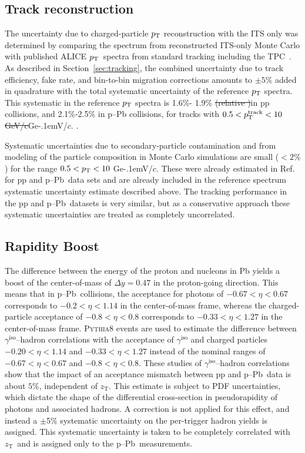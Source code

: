 \documentclass[ALICE,manyauthors]{cernphprep}
\newcommand{\zt}{\ensuremath{z_{\mathrm{T}}}\xspace}
\newcommand{\gammaiso}{\ensuremath{\gamma^\mathrm{iso}}}
\newcommand{\pPb}          {\mbox{p--Pb}\xspace}
\newcommand{\pt}           {\ensuremath{p_{\rm T}}\xspace}
\newcommand{\GeVc}         {Ge\kern-.1emV/$c$\xspace}
\providecommand{\DIFdeltex}[1]{{\protect\color{red}\sout{#1}}}                      %
\providecommand{\DIFaddbegin}{} %
\providecommand{\DIFaddend}{} %
\providecommand{\DIFdelbegin}{} %
\providecommand{\DIFdelend}{} %
\providecommand{\DIFdel}[1]{\texorpdfstring{\DIFdeltex{#1}}{}} %
\newcommand{\DIFscaledelfig}{0.5}
\newlength{\DIFdelgraphicswidth} %
\newlength{\DIFdelgraphicsheight} %
\newcommand{\DIFaddincludegraphics}[2][]{{\color{blue}\fbox{\DIFOincludegraphics[#1]{#2}}}} %
\newcommand{\DIFdelincludegraphics}[2][]{%
\sbox{\DIFdelgraphicsbox}{\DIFOincludegraphics[#1]{#2}}%
\settoboxwidth{\DIFdelgraphicswidth}{\DIFdelgraphicsbox} %
\settoboxtotalheight{\DIFdelgraphicsheight}{\DIFdelgraphicsbox} %
\scalebox{\DIFscaledelfig}{%
\parbox[b]{\DIFdelgraphicswidth}{\usebox{\DIFdelgraphicsbox}\\[-\baselineskip] \rule{\DIFdelgraphicswidth}{0em}}\llap{\resizebox{\DIFdelgraphicswidth}{\DIFdelgraphicsheight}{%
\setlength{\unitlength}{\DIFdelgraphicswidth}%
\begin{picture}(1,1)%
\thicklines\linethickness{2pt} %
{\color[rgb]{1,0,0}\put(0,0){\framebox(1,1){}}}%
{\color[rgb]{1,0,0}\put(0,0){\line( 1,1){1}}}%
{\color[rgb]{1,0,0}\put(0,1){\line(1,-1){1}}}%
\end{picture}%
}\hspace*{3pt}}} %
} %
\DeclareRobustCommand{\DIFaddbegin}{\DIFOaddbegin \let\includegraphics\DIFaddincludegraphics} %
\DeclareRobustCommand{\DIFaddend}{\DIFOaddend \let\includegraphics\DIFOincludegraphics} %
\DeclareRobustCommand{\DIFdelbegin}{\DIFOdelbegin \let\includegraphics\DIFdelincludegraphics} %
\DeclareRobustCommand{\DIFdelend}{\DIFOaddend \let\includegraphics\DIFOincludegraphics} %
\begin{document}
\subsection{Track reconstruction}
The uncertainty due to charged-particle $\pt$ reconstruction with the ITS only was determined by comparing the spectrum from reconstructed ITS-only Monte Carlo with published ALICE \pt~spectra from standard tracking including the TPC~\cite{Acharya:2018qsh}.
As described in Section~\ref{sec:tracking}, the combined uncertainty due to track efficiency, fake rate, and bin-to-bin migration corrections amounts to $\pm5\%$ added in quadrature with the total systematic uncertainty of the reference $\pt$ spectra. This systematic in the reference $\pt$ spectra is 1.6\%- 1.9$\%$ \DIFdelbegin \DIFdel{(relative )}\DIFdelend in pp collisions, and 2.1$\%$-2.5$\%$ in \pPb collisions, for tracks with $0.5<\pt^\mathrm{track}<10$ \DIFdelbegin \DIFdel{GeV/c}\DIFdelend \DIFaddbegin \GeVc\DIFaddend . \cite{Acharya:2018qsh}. 

Systematic uncertainties due to secondary-particle contamination and from modeling of the particle composition in Monte Carlo simulations are small ($<2\%$) for the range $0.5<\pt<10$ \GeVc. These were already estimated in Ref. \cite{Acharya:2018qsh} for pp and \pPb~data sets and are already included in the reference spectrum systematic uncertainty estimate described above. The tracking performance in the pp and \pPb~datasets is very similar, but as a conservative approach these systematic uncertainties are treated as completely uncorrelated.

\subsection{Rapidity Boost}
The difference between the energy of the proton and nucleons in Pb yields a boost of the center-of-mass of $\Delta y = 0.47$ in the proton-going direction. This means that in \pPb~collisions, the acceptance for photons of $-0.67<\eta<0.67$ corresponds to $-0.2<\eta<1.14$ in the center-of-mass frame, whereas the charged-particle acceptance of $-0.8<\eta<0.8$ corresponds to $-0.33<\eta<1.27$ in the center-of-mass frame.
\textsc{Pythia8} events are used to estimate the difference between \gammaiso--hadron correlations with the acceptance of $\gammaiso$ and charged particles  $-0.20<\eta<1.14$ and $-0.33<\eta<1.27$ instead of the nominal ranges of $-0.67<\eta<0.67$ and $-0.8<\eta<0.8$. These studies of \gammaiso--hadron correlations show that the impact of an acceptance mismatch between pp and \pPb~data is about $5\%$, independent of $\zt$. This estimate is subject to PDF uncertainties, which dictate the shape of the differential cross-section in pseudorapidity of photons and associated hadrons. A correction is not applied for this effect, and instead a \DIFdelbegin \DIFdel{$\pm$}\DIFdelend 5$\%$ systematic uncertainty on the per-trigger hadron yields is assigned. This systematic uncertainty is taken to be completely correlated with \zt~and is assigned only to the \pPb~measurements. 
\end{document}
